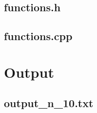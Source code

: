 	\subsection{functions.h}
		
	\bigskip
	\subsection{functions.cpp}
		

\section{Output}
	\subsection{output\_n\_10.txt}
		
\newpage
		
